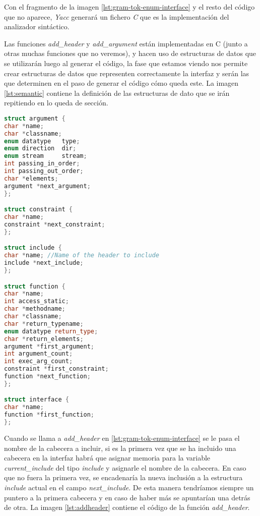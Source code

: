 \par\bigskip
Con el fragmento de la imagen \ref{lst:gram-tok-enum-interface} y el resto del código que no aparece, \textit{Yacc} generará un fichero \textit{C} que es la implementación del analizador sintáctico. 
\par\bigskip

Las funciones \textit{add\_header} y \textit{add\_argument} están implementadas en C (junto a otras muchas funciones que no veremos), y hacen uso de estructuras de datos que se utilizarán luego al generar el código, la fase que estamos viendo nos permite crear estructuras de datos que representen correctamente la interfaz y serán las que determinen en el paso de generar el código cómo queda este. La imagen \ref{lst:semantic} contiene la definición de las estructuras de dato que se irán repitiendo en lo queda de sección.

\bigskip
\begin{minipage}{\linewidth}
\begin{lstlisting}[caption={Definición de las estructuras de datos utilizadas en el compilador.},captionpos=b, label={lst:semantic}, language=C++]
struct argument {
char *name;
char *classname;
enum datatype   type;
enum direction  dir;
enum stream     stream;
int passing_in_order;
int passing_out_order;
char *elements;
argument *next_argument;
};

struct constraint {
char *name;
constraint *next_constraint;
};

struct include {
char *name; //Name of the header to include
include *next_include;
};

struct function {
char *name;
int access_static;
char *methodname;
char *classname;
char *return_typename;
enum datatype return_type;
char *return_elements;
argument *first_argument;
int argument_count;
int exec_arg_count;
constraint *first_constraint;
function *next_function;
};

struct interface {
char *name;
function *first_function;
};
\end{lstlisting}
\end{minipage}

\par\bigskip

Cuando se llama a \textit{add\_header} en \ref{lst:gram-tok-enum-interface} se le pasa el nombre de la cabecera a incluir, si es la primera vez que se ha incluido una cabecera en la interfaz habrá que asignar memoria para la variable \textit{current\_include} del tipo \textit{include} y asignarle el nombre de la cabecera. En caso que no fuera la primera vez, se encadenaría la nueva inclusión a la estructura \textit{include} actual en el campo \textit{next\_include}. De esta manera tendríamos siempre un puntero a la primera cabecera y en caso de haber más se apuntarían una detrás de otra. La imagen \ref{lst:addheader} contiene el código de la función \textit{add\_header}.

